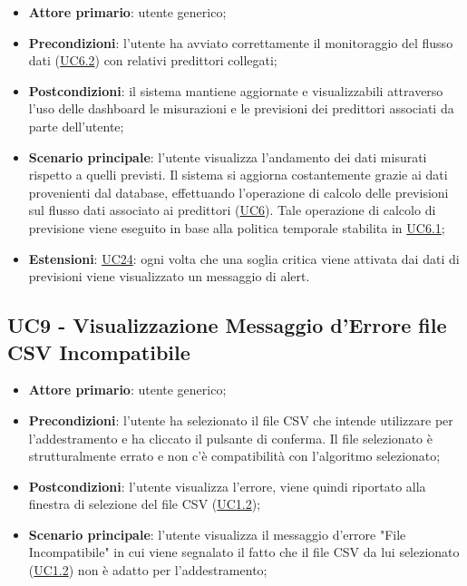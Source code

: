 		\begin{itemize}
			\item\textbf{Attore primario}: utente generico;
			\item\textbf{Precondizioni}: l’utente ha avviato correttamente il monitoraggio del flusso dati (\hyperref[par:UC6.2]{UC6.2}) con relativi predittori collegati;
			\item\textbf{Postcondizioni}: il sistema mantiene aggiornate e visualizzabili attraverso l’uso delle dashboard le misurazioni e le previsioni dei predittori associati da parte dell’utente;
			\item\textbf{Scenario principale}: l’utente visualizza l’andamento dei dati misurati rispetto a quelli previsti. Il sistema si aggiorna costantemente grazie ai dati provenienti dal database, effettuando l’operazione di calcolo delle previsioni sul flusso dati associato ai predittori (\hyperref[par:UC6]{UC6}). Tale operazione di calcolo di previsione viene eseguito in base alla politica temporale stabilita in \hyperref[par:UC6.1]{UC6.1};		
			\item\textbf{Estensioni}: \hyperref[par:UC24]{UC24}: ogni volta che una soglia critica viene attivata dai dati di previsioni viene visualizzato un messaggio di alert.
		\end{itemize}

	
	\label{par:UC9}
	\subsection{UC9 - Visualizzazione Messaggio d'Errore file CSV Incompatibile}
		\begin{itemize}
			\item\textbf{Attore primario}: utente generico;
			\item\textbf{Precondizioni}: l’utente ha selezionato il file CSV che intende utilizzare per l'addestramento e ha cliccato il pulsante di conferma. Il file selezionato è strutturalmente errato e non c'è compatibilità con l'algoritmo selezionato;
			\item\textbf{Postcondizioni}: l'utente visualizza l'errore, viene quindi riportato alla finestra di selezione del file CSV (\hyperref[par:UC1.2]{UC1.2});
			\item\textbf{Scenario principale}: l’utente visualizza il messaggio d'errore "File Incompatibile" in cui viene segnalato il fatto che il file CSV da lui selezionato (\hyperref[par:UC1.2]{UC1.2}) non è adatto per l'addestramento; 		
		\end{itemize}

